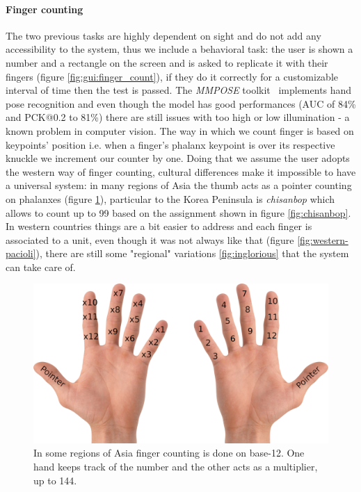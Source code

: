 \paragraph{Finger counting}
The two previous tasks are highly dependent on sight and do not add any accessibility to the system, thus we include a behavioral task: the user is shown a number and a rectangle on the screen and is asked to replicate it with their fingers (figure \ref{fig:gui:finger_count}), if they do it correctly for a customizable interval of time then the test is passed.
The \emph{MMPOSE} toolkit~\cite{mmpose} implements hand pose recognition and even though the model has good performances (AUC of 84\% and PCK@0.2 to 81\%) there are still issues with too high or low illumination - a known problem in computer vision.
The way in which we count finger is based on keypoints' position i.e. when a finger's phalanx keypoint is over its respective knuckle we increment our counter by one.
Doing that we assume the user adopts the western way of finger counting, cultural differences make it impossible to have a universal system: in many regions of Asia the thumb acts as a pointer counting on phalanxes (figure \ref{fig:asian-count}), particular to the Korea Peninsula is \emph{chisanbop} which allows to count up to 99 based on the assignment shown in figure \ref{fig:chisanbop}.
In western countries things are a bit easier to address and each finger is associated to a unit, even though it was not always like that (figure \ref{fig:western-pacioli}), there are still some "regional" variations \ref{fig:inglorious} that the system can take care of.

\begin{figure}[h!t]
    \centering
    \includegraphics[scale=0.6]{assets/images/finger_count_asia.png}
    \caption{In some regions of Asia finger counting is done on base-12. One hand keeps track of the number and the other acts as a multiplier, up to 144.}
    \label{fig:asian-count}
\end{figure}


